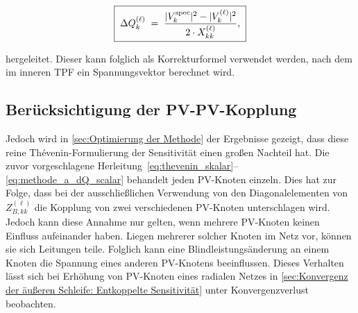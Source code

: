 \begin{equation}
	\boxed{\;\Delta Q^{(\ell)}_k \;=\; \frac{|V^{\mathrm{spec}}_k|^2 - |V^{(\ell)}_k|^2}{2\cdot X^{(\ell)}_{kk}}, \;}
	\label{eq:methode_a_dQ_scalar}
\end{equation}

hergeleitet.
Dieser kann folglich als Korrekturformel verwendet werden, nach dem im inneren TPF ein Spannungsvektor berechnet wird.


\subsection{Berücksichtigung der PV-PV-Kopplung}
\label{subsec:PV-PV-Kopplung}

Jedoch wird in \cref{sec:Optimierung der Methode} der Ergebnisse gezeigt, dass diese reine Thévenin-Formulierung der Sensitivität einen großen Nachteil hat.
Die zuvor vorgeschlagene Herleitung~\eqref{eq:thevenin_skalar}--\eqref{eq:methode_a_dQ_scalar} behandelt jeden PV-Knoten einzeln.
Dies hat zur Folge, dass bei der ausschließlichen Verwendung von den Diagonalelementen von~$Z^{(\ell)}_{B,kk}$ die Kopplung von zwei verschiedenen PV-Knoten unterschlagen wird.
Jedoch kann diese Annahme nur gelten, wenn mehrere PV-Knoten keinen Einfluss aufeinander haben.
Liegen mehrerer solcher Knoten im Netz vor, können sie sich Leitungen teile. 
Folglich kann eine Blindleistungsänderung an einem Knoten die Spannung eines anderen PV-Knotens beeinflussen.
Dieses Verhalten lässt sich bei Erhöhung von PV-Knoten eines radialen Netzes in \cref{sec:Konvergenz der äußeren Schleife: Entkoppelte Sensitivität} unter Konvergenzverlust beobachten.\\


